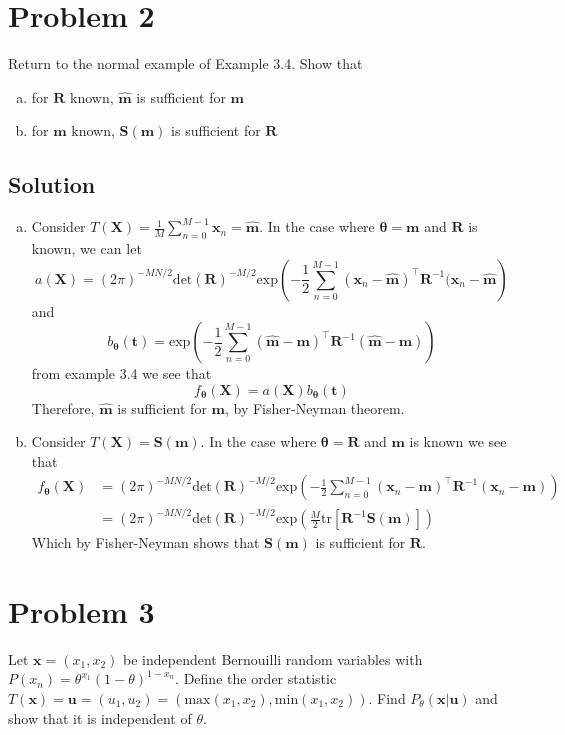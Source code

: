 \documentclass[a4paper]{article}
\begin{document}
\section*{Problem 2}%
Return to the normal example of Example 3.4. Show that 
\begin{enumerate}[a.]
  \item for $\bm{R}$ known, $\hat{\bm{m}}$ is sufficient for $\bm{m}$
  \item for $\bm{m}$ known, $\bm{S}(\bm{m})$ is sufficient for $\bm{R}$
\end{enumerate}

\subsection*{Solution}%
\begin{enumerate}[a.]
  \item Consider $T(\bm{X}) = \frac{1}{M} \sum_{n=0}^{M-1} \bm{x}_n = \hat{\bm{m}}$. In the case where $\bm{\theta} = \bm{m}$ and $\bm{R}$ is known, we can let
    \[
    a(\bm{X}) =  (2\pi)^{-MN/2} \text{det}(\bm{R})^{-M/2} \text{exp} \left(-\frac{1}{2} \sum_{n=0}^{M-1}(\bm{x}_n - \hat{\bm{m}})^\top \bm{R}^{-1}(\bm{x}_n - \hat{\bm{m}}  \right)
    \]
    and 
    \[
      b_{\bm{\theta}}(\bm{t}) =  \text{exp} \left( -\frac{1}{2} \sum_{n=0}^{M-1} (\hat{\bm{m}} - \bm{m})^\top \bm{R}^{-1} (\hat{\bm{m}} - \bm{m}) \right)
    \]
    from example 3.4 we see that
    \[
      f_{\bm{\theta}}(\bm{X}) = a(\bm{X})b_{\bm{\theta}}(\bm{t})
    \]
    Therefore, $\hat{\bm{m}}$ is sufficient for $\bm{m}$, by Fisher-Neyman theorem.
  \item Consider $T(\bm{X}) = \bm{S}(\bm{m})$. In the case where $\bm{\theta} = \bm{R}$ and $\bm{m}$ is known we see that
    \[
      \begin{aligned}
        f_{\bm{\theta}}(\bm{X}) &=  (2\pi)^{-MN/2} \text{det} \left( \bm{R} \right)^{-M/2} \text{exp} \left( -\frac{1}{2} \sum_{n=0}^{M-1} (\bm{x}_n - \bm{m})^\top \bm{R}^{-1}(\bm{x}_n - \bm{m}) \right) \\
                                &=(2\pi)^{-MN/2} \text{det} \left( \bm{R} \right)^{-M/2} \text{exp} \left( \frac{M}{2} \text{tr} \left[ \bm{R}^{-1}\bm{S}(\bm{m}) \right] \right)
      \end{aligned}
    \]
    Which by Fisher-Neyman shows that $\bm{S}(\bm{m})$ is sufficient for $\bm{R}$.
\end{enumerate}

\section*{Problem 3}%
Let $\bm{x} = (x_1, x_2)$ be independent Bernouilli random variables with $P(x_n) = \theta^{x_1}(1-\theta)^{1 - x_n}$. Define the order statistic $T(\bm{x}) = \bm{u} = (u_1, u_2) = (\text{max}(x_1, x_2), \text{min}(x_1, x_2))$. Find $P_{\theta}(\bm{x}|\bm{u})$ and show that it is independent of $\theta$.
\end{document}
